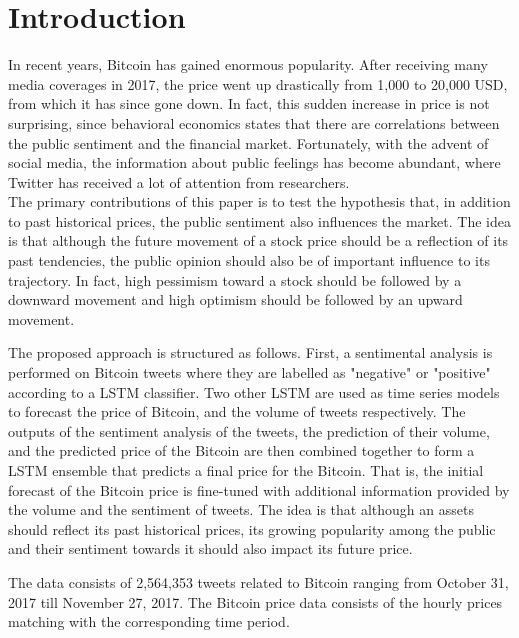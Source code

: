 \documentclass[conference]{IEEEtran}
\begin{document}
\section{Introduction}
\par In recent years, Bitcoin has gained enormous popularity. After receiving many media coverages in 2017, the price went up drastically from 1,000 to 20,000 USD, from which it has since gone down. In fact, this sudden increase in price is not surprising, since behavioral economics states that there are correlations between the public sentiment and the financial market. Fortunately, with the advent of social media, the information about public feelings has become abundant, where Twitter has received a lot of attention from researchers. \\
	The primary contributions of this paper is to test the hypothesis that, in addition to past historical prices, the public sentiment also influences the market. The idea is that although the future movement of a stock price should be a reflection of its past tendencies, the public opinion should also be of important influence to its trajectory. In fact, high pessimism toward a stock should be followed by a downward movement and high optimism should be followed by an upward movement. 
\par The proposed approach is structured as follows. First, a sentimental analysis is  performed on Bitcoin tweets where they are labelled as "negative" or "positive" according to a LSTM classifier. Two other LSTM are used as time series models to forecast the price of Bitcoin, and the volume of tweets respectively. The outputs of the sentiment analysis of the tweets, the prediction of their volume, and the predicted price of the Bitcoin are then combined together to form a LSTM ensemble that predicts a final price for the Bitcoin. That is, the initial forecast of the Bitcoin price is fine-tuned with additional information provided by the volume and the sentiment of tweets. The idea is that although an assets should reflect its past historical prices, its growing popularity among the public and their sentiment towards it should also impact its future price.
\par	 The data consists of 2,564,353 tweets related to Bitcoin ranging from October 31, 2017 till November 27, 2017.    The Bitcoin price data consists of the hourly prices matching with the corresponding time period.
	 
\end{document}
